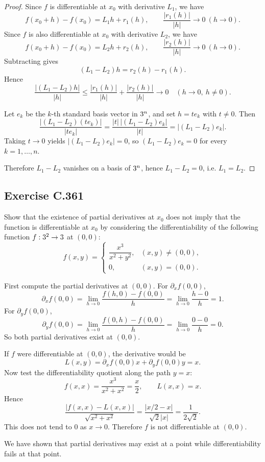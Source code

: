 \documentclass{article}
\begin{document}
\begin{proof}
  Since $f$ is differentiable at $x_0$ with derivative $L_1$, we have
  \[
    f(x_0+h)-f(x_0)=L_1h+r_1(h),
    \qquad \frac{|r_1(h)|}{|h|}\to 0 \ (h\to 0).
  \]
  Since $f$ is also differentiable at $x_0$ with derivative $L_2$, we have
  \[
    f(x_0+h)-f(x_0)=L_2h+r_2(h),
    \qquad \frac{|r_2(h)|}{|h|}\to 0 \ (h\to 0).
  \]
  Subtracting gives
  \[
    (L_1-L_2)h=r_2(h)-r_1(h).
  \]
  Hence
  \[
    \frac{|(L_1-L_2)h|}{|h|}
    \le
    \frac{|r_1(h)|}{|h|}+\frac{|r_2(h)|}{|h|}
    \to 0
    \quad (h\to 0,\ h\neq 0).
  \]

  Let $e_k$ be the $k$-th standard basis vector in $3^n$, and set
  $h=t e_k$ with $t\neq 0$. Then
  \[
    \frac{|(L_1-L_2)(t e_k)|}{|t e_k|}
    = \frac{|t|\,|(L_1-L_2)e_k|}{|t|}
    = |(L_1-L_2)e_k|.
  \]
  Taking $t\to 0$ yields $|(L_1-L_2)e_k|=0$, so
  $(L_1-L_2)e_k=0$ for every $k=1,\dots,n$.

  Therefore $L_1-L_2$ vanishes on a basis of $3^n$, hence
  $L_1-L_2=0$, i.e. $L_1=L_2$.
\end{proof}

\subsection{Exercise C.361}

Show that the existence of partial derivatives at $x_0$ does not imply
that the function is differentiable at $x_0$ by considering the
differentiability of the following function $f : 3^2 \to 3$ at
$(0,0)$:
\[
  f(x,y)=
  \begin{cases}
    \dfrac{x^3}{x^2+y^2}, & (x,y)\neq(0,0), \\
    0, & (x,y)=(0,0).
  \end{cases}
\]

\begin{solution}
  First compute the partial derivatives at $(0,0)$.
  For $\partial_x f(0,0)$,
  \[
    \partial_x f(0,0)
    = \lim_{h\to 0}\frac{f(h,0)-f(0,0)}{h}
    = \lim_{h\to 0}\frac{h-0}{h}=1.
  \]
  For $\partial_y f(0,0)$,
  \[
    \partial_y f(0,0)
    = \lim_{h\to 0}\frac{f(0,h)-f(0,0)}{h}
    = \lim_{h\to 0}\frac{0-0}{h}=0.
  \]
  So both partial derivatives exist at $(0,0)$.

  If $f$ were differentiable at $(0,0)$, the derivative would be
  \[
    L(x,y)=\partial_x f(0,0)x+\partial_y f(0,0)y=x.
  \]
  Now test the differentiability quotient along the path $y=x$:
  \[
    f(x,x)=\frac{x^3}{x^2+x^2}=\frac{x}{2},
    \qquad
    L(x,x)=x.
  \]
  Hence
  \[
    \frac{|f(x,x)-L(x,x)|}{\sqrt{x^2+x^2}}
    = \frac{|x/2-x|}{\sqrt{2}|x|}
    = \frac{1}{2\sqrt{2}}.
  \]
  This does not tend to $0$ as $x\to 0$. Therefore $f$ is not
  differentiable at $(0,0)$.

  We have shown that partial derivatives may exist at a point while
  differentiability fails at that point.
\end{solution}
\end{document}
